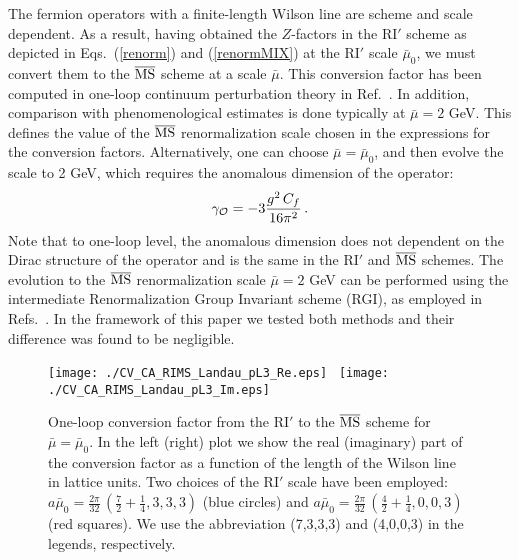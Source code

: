 \documentclass[12pt,tighten,nofootinbib,amssymb,floatfix]{article}
\newcommand{\MSb}{{\overline{\rm MS}}}
\newcommand{\be}{\begin{equation}}
\newcommand{\ee}{\end{equation}}
\begin{document}
The fermion operators with a finite-length Wilson line are scheme and scale dependent. As a result, having obtained 
the $Z$-factors in the RI$'$ scheme as depicted in Eqs.~(\ref{renorm}) and (\ref{renormMIX})
at the RI$'$ scale $\bar\mu_0$, we must convert them to the $\MSb$ scheme at a scale $\bar\mu$. This conversion factor has 
been computed in one-loop continuum perturbation theory in Ref.~\cite{Constantinou:2017sej}. In addition, comparison 
with phenomenological estimates is done typically at $\bar\mu{=}2$ GeV. This defines the value of the $\MSb$ renormalization 
scale chosen in the expressions for the conversion factors. Alternatively, one can choose $\bar\mu{=}\bar\mu_0$, and then
evolve the scale to 2 GeV, which requires the anomalous dimension of the operator:
\be
\gamma_{\cal O} =  -3 \frac{g^2\,C_f}{16\pi^2} \,.
\ee
Note that to one-loop level, the anomalous dimension does not dependent on the Dirac structure of the operator
and is the same in the RI$'$ and $\MSb$ schemes. The evolution to the $\MSb$ renormalization scale  
$\bar\mu{=}2$ GeV can be performed using the intermediate Renormalization Group Invariant scheme (RGI), as 
employed in Refs.~\cite{Constantinou:2014fka,Alexandrou:2015sea}. In the framework of this paper we tested both 
methods and their difference was found to be negligible.

\begin{figure}[h]
\centering
\texttt{[image: ./CV\_CA\_RIMS\_Landau\_pL3\_Re.eps]}\,\,\,
\texttt{[image: ./CV\_CA\_RIMS\_Landau\_pL3\_Im.eps]}
\vspace*{-0.3cm}
\begin{minipage}{15cm}
\hspace*{3cm}
\caption{\small{One-loop conversion factor from the RI$'$ to the $\MSb$ scheme for $\bar\mu{=}\bar\mu_0$. In 
the left (right) plot we show the real (imaginary) part of the conversion factor as a function 
of the length of the Wilson line in lattice units. Two choices of the RI$'$ scale have been
employed: $a\bar\mu_0{=}\frac{2\pi}{32}\, (\frac{7}{2}{+}\frac{1}{4}, 3,3,3)$ (blue circles)  and 
$a\bar\mu_0{=}\frac{2\pi}{32}\, (\frac{4}{2}{+}\frac{1}{4}, 0,0,3)$  (red squares). 
We use the abbreviation (7,3,3,3) and (4,0,0,3) in the legends, respectively. }}
\label{fig:C} 
\end{minipage}
\end{figure}
\end{document}
